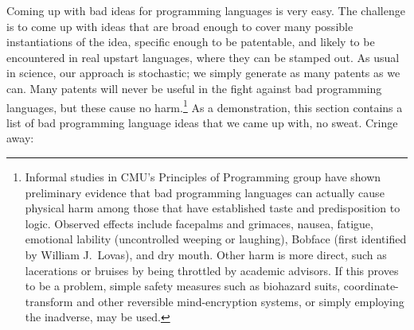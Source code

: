 \documentclass[acmtocl]%
{boviktrans}
\begin{document}
Coming up with bad ideas for programming languages is very easy. The
challenge is to come up with ideas that are broad enough to cover many
possible instantiations of the idea, specific enough to be patentable,
and likely to be encountered in real upstart languages, where they can
be stamped out. As usual in science, our approach is stochastic; we
simply generate as many patents as we can. Many patents will never be
useful in the fight against bad programming languages, but these cause
no harm.\!\footnote{Informal studies in CMU's Principles of
  Programming group have shown preliminary evidence that bad
  programming languages can actually cause physical harm among those
  that have established taste and predisposition to logic. Observed
  effects include facepalms and grimaces, nausea, fatigue, emotional
  lability (uncontrolled weeping or laughing), Bobface (first identified
  by William J.~Lovas), and dry mouth. Other harm is more direct, such
  as lacerations or bruises by being throttled by academic advisors.
  If this proves to be a problem, simple safety measures such as biohazard
  suits, coordinate-transform and other reversible mind-encryption systems,
  or simply employing the inadverse, may be used.}
As a demonstration, this section contains a list of bad programming language
ideas that we came up with, no sweat. Cringe away:
\end{document}
